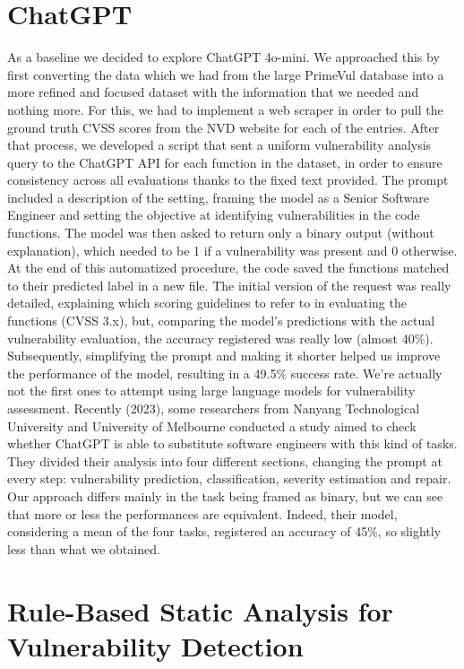 \documentclass{article}
\begin{document}
\section{ChatGPT}
As a baseline we decided to explore ChatGPT 4o-mini. We approached this by first converting the data which we had from the large PrimeVul database into a more refined and focused dataset with the information that we needed and nothing more. For this, we had to implement a web scraper in order to pull the ground truth CVSS scores from the NVD website for each of the entries. After that process, we developed a script that sent a uniform vulnerability analysis query to the ChatGPT API for each function in the dataset, in order to ensure consistency across all evaluations thanks to the fixed text provided.
The prompt included a description of the setting, framing the model as a Senior Software Engineer and setting the objective at identifying vulnerabilities in the code functions. The model was then asked to return only a binary output (without explanation), which needed to be 1 if a vulnerability was present and 0 otherwise. At the end of this automatized procedure, the code saved the functions matched to their predicted label in a new file.
The initial version of the request was really detailed, explaining which scoring guidelines to refer to in evaluating the functions (CVSS 3.x), but, comparing the model’s predictions with the actual vulnerability evaluation, the accuracy registered was really low (almost 40\%). Subsequently, simplifying the prompt and making it shorter helped us improve the performance of the model, resulting in a 49.5\% success rate.
We’re actually not the first ones to attempt using large language models for vulnerability assessment. Recently (2023), some researchers from Nanyang Technological University and University of Melbourne conducted a study aimed to check whether ChatGPT is able to substitute software engineers with this kind of tasks. They divided their analysis into four different sections, changing the prompt at every step: vulnerability prediction, classification, severity estimation and repair. Our approach differs mainly in the task being framed as binary, but we can see that more or less the performances are equivalent. Indeed, their model, considering a mean of the four tasks, registered an accuracy of 45\%, so slightly less than what we obtained.


\section{Rule-Based Static Analysis for Vulnerability Detection}
\end{document}
